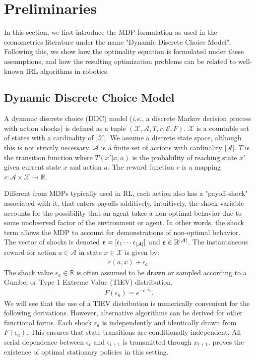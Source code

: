 \documentclass{article}
\renewcommand{\vec}[1]{\mbox{\bm{$#1$}}}
\begin{document}
\section{Preliminaries}

In this section, we first introduce the MDP formulation as used in the econometrics literature under the name "Dynamic Discrete Choice Model". Following this, we show how the optimality equation is formulated under these assumptions, and how the resulting optimization problems can be related to well-known IRL algorithms in robotics.


\subsection{Dynamic Discrete Choice Model}

A dynamic discrete choice (DDC) model (\emph{i.e.}, a discrete Markov decision process with action shocks) is defined as a tuple $(\mathcal{X,A}, T,r,\mathcal{E},F)$. $\mathcal{X}$ is a countable set of states with a cardinality of $|\mathcal{X}|$. We assume a discrete state space, although this is not strictly necessary. $\mathcal{A}$ is a finite set of actions with cardinality $|\mathcal{A}|$. $T$ is the transition function where $T(x'|x,a)$ is the probability of reaching state $x'$ given current state $x$ and action $a$. The reward function $r$ is a mapping $r:\mathcal{A}\times\mathcal{X}\rightarrow \mathbb{R}$.

Different from MDPs typically used in RL, each action also has a "payoff-shock" associated with it, that enters payoffs additively.
Intuitively, the shock variable accounts for the possibility that an agent takes a non-optimal behavior due to some unobserved factor of the environment or agent. In other words, the shock term allows the MDP to account for demonstrations of non-optimal behavior.
The vector of shocks is denoted $\vec{\epsilon} = [ \epsilon_{1} \cdots \epsilon_{|\mathcal{A}|} ]$ and $\vec{\epsilon}\in \mathbb{R}^{|\mathcal{A}|}$. The instantaneous reward for action $a \in \mathcal{A}$ in state $x \in \mathcal{X}$ is given by:
\begin{eqnarray}
r(a,x)+\epsilon_a.
\end{eqnarray}
The shock value $\epsilon_a\in\mathbb{R}$ is often assumed to be drawn or sampled according to a Gumbel or Type 1 Extreme Value (TIEV) distribution,
\begin{align}
F(\epsilon_a)=e^{-e^{-\epsilon_a}}.
\end{align}
We will see that the use of a TIEV distribution is numerically convenient for the following derivations. However, alternative algorithms can be derived for other functional forms. Each shock $\epsilon_a$ is independently and identically drawn from $F(\epsilon_a)$. This ensures that state transitions are conditionally independent. All serial dependence between $\epsilon_{t}$ and $\epsilon_{t+1}$ is transmitted through $x_{t+1}$. \cite{rust_theory} proves the existence of optimal stationary policies in this setting.
\end{document}
